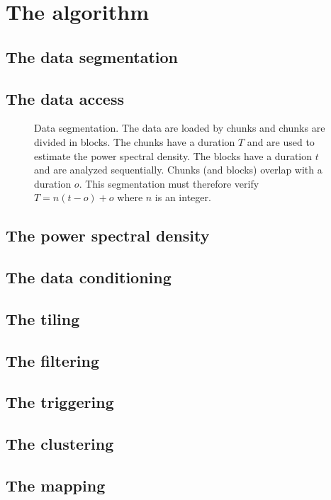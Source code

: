 \section{The algorithm} \label{sec:algorithm}

\subsection{The data segmentation} \label{sec:algorithm:segmentation}

\subsection{The data access} \label{sec:algorithm:data}

\begin{figure}
  \center
  \caption{Data segmentation. The data are loaded by chunks and chunks are divided in blocks. The chunks have a duration $T$ and are used to estimate the power spectral density. The blocks have a duration $t$ and are analyzed sequentially. Chunks (and blocks) overlap with a duration $o$. This segmentation must therefore verify $T=n(t-o)+o$ where $n$ is an integer.}
  \label{fig:segmentation}
\end{figure}

\subsection{The power spectral density} \label{sec:algorithm:psd}

\subsection{The data conditioning} \label{sec:algorithm:conditioning}

\subsection{The tiling} \label{sec:algorithm:tiling}

\subsection{The filtering} \label{sec:algorithm:conditioning}

\subsection{The triggering} \label{sec:algorithm:triggering}

\subsection{The clustering} \label{sec:algorithm:conditioning}

\subsection{The mapping} \label{sec:algorithm:mapping}
